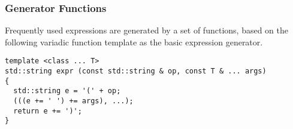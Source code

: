 \subsubsection*{{\SMTLIB} Generator Functions}





Frequently used {\SMTLIB} expressions are generated by a set of functions, based on the following variadic function template as the basic expression generator.

\begin{lstlisting}[style=c++]
template <class ... T>
std::string expr (const std::string & op, const T & ... args)
{
  std::string e = '(' + op;
  (((e += ' ') += args), ...);
  return e += ')';
}
\end{lstlisting}

